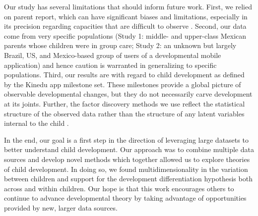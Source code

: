 \documentclass[man, floatsintext]{apa7}
\begin{document}
Our study has several limitations that should inform future work. First,
we relied on parent report, which can have signiﬁcant biases and
limitations, especially in its precision regarding capacities that are
difﬁcult to observe \parencite[e.g., cognitive abilities;][]{frank2021,feldman2000}. Second, our
data come from very speciﬁc populations (Study 1: middle- and
upper-class Mexican parents whose children were in group care; Study 2:
an unknown but largely Brazil, US, and Mexico-based group of users of a developmental mobile application) and hence
caution is warranted in generalizing to specific populations. Third, our results are with regard to child development
as deﬁned by the Kinedu app milestone set. These milestones provide a global picture of observable developmental changes, but they do not necessarily carve development at its joints. Further, the factor discovery methods we use reflect the statistical structure of the observed data rather than the structure of any latent variables internal to the child \parencite{bork2017,maraun2003,van-der-maas2006}.

In the end, our goal is a first step in the direction of leveraging
large datasets to better understand child development. Our approach was
to combine multiple data sources and develop novel methods which
together allowed us to explore theories of child development. In doing
so, we found multidimensionality in the variation between children and support for the
development differentiation hypothesis both across and within children. Our hope is
that this work encourages others to continue to advance developmental
theory by taking advantage of opportunities provided by new, 
larger data sources.

\printbibliography
\end{document}
